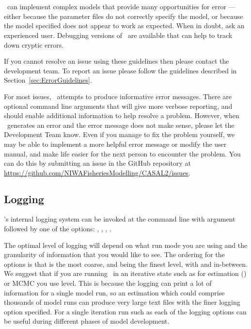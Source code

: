 \section{\label{sec:TroubleShooting}}

\CNAME\ can implement complex models that provide many opportunities for error --- either because the parameter files do not correctly specify the model, or because the model specified does not appear to work as expected. When in doubt, ask an experienced user. Debugging versions of \CNAME\ are available that can help to track down cryptic errors.

If you cannot resolve an issue using these guidelines then please contact the development team. To report an issue please follow the guidelines described in Section~\ref{sec:ErrorGuidelines}.

For most issues, \CNAME\ attempts to produce informative error messages. There are optional command line arguments that will give more verbose reporting, and should enable additional information to help resolve a problem. However, when \CNAME\ generates an error and the error message does not make sense, please let the Development Team know. Even if you manage to fix the problem yourself, we may be able to implement a more helpful error message or modify the user manual, and make life easier for the next person to encounter the problem. You can do this by submitting an issue in the GitHub repository at \url{https://github.com/NIWAFisheriesModelling/CASAL2/issues}.

\subsection{Logging}\label{sec:TroubleShooting-logging}

\CNAME's internal logging system can be invoked at the command line with argument   followed by one of the options: , , , .

The optimal level of logging will depend on what run mode you are using and the granularity of information that you would like to see. The ordering for the options is that  is the most coarse, and  being the finest level, with  and  in-between. We suggest that if you are running \CNAME\ in an iterative state such as for estimation () or MCMC you use  level. This is because the logging can print a lot of information for a single model run, so an estimation which could comprise thousands of model runs can produce very large text files with the finer logging option specified. For a single iteration run such as  each of the logging options can be useful during different phases of model development.


